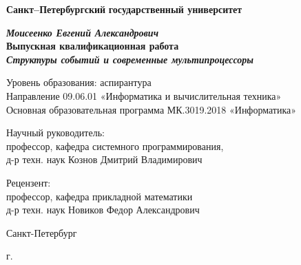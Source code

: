 
\begin{titlepage}
\begin{center}

\textbf{Санкт--Петербургский}
\textbf{государственный университет}

\vspace{35mm}

\textbf{\textit{\large Моисеенко Евгений Александрович}} \\[8mm]
\textbf{\large Выпускная квалификационная работа}\\[3mm]
\textbf{\textit{\large Структуры событий и современные мультипроцессоры}}

\vspace{20mm}
Уровень образования: аспирантура\\
Направление 09.06.01 «Информатика и вычислительная техника»\\
Основная образовательная программа МК.3019.2018 «Информатика»\\

\vspace{15mm}

\begin{flushright}
\begin{minipage}[t]{0.7\textwidth}
{Научный руководитель:} \\
профессор, кафедра системного программирования, \\ д-р техн. наук Кознов Дмитрий Владимирович

\vspace{10mm}

{Рецензент:} \\
профессор, кафедра прикладной математики \\ д-р техн. наук Новиков Федор Александрович

\end{minipage}
\end{flushright}

\vfill 

{Санкт-Петербург}
\par{\the\year{} г.}
\end{center}
\end{titlepage}
